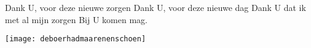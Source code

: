 \beginverse*
Dank U, voor deze nieuwe zorgen
Dank U, voor deze nieuwe dag
Dank U dat ik met al mijn zorgen
Bij U komen mag. 
\endverse
\endsong
\begin{intersong}
    \texttt{[image: deboerhadmaarenenschoen]}
\end{intersong}